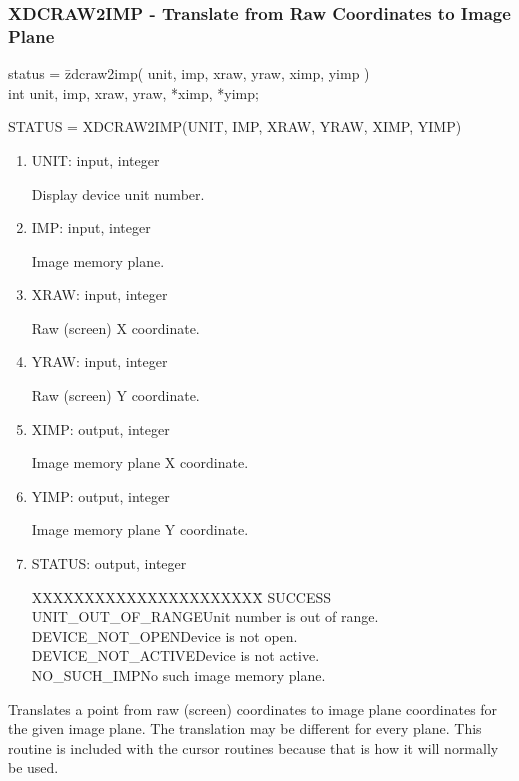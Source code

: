 \subsubsection{XDCRAW2IMP - Translate from Raw Coordinates to Image Plane}
\begin{tabbing}
status = \=zdcraw2imp( unit, imp, xraw, yraw, ximp, yimp )\\
\>int  unit, imp, xraw, yraw, *ximp, *yimp;\\
\end{tabbing}
STATUS = XDCRAW2IMP(UNIT, IMP, XRAW, YRAW, XIMP, YIMP)
\begin{enumerate}
\item UNIT:  input, integer

Display device unit number.
\item IMP:  input, integer

Image memory plane.
\item XRAW:  input, integer

Raw (screen) X coordinate.
\item YRAW:  input, integer

Raw (screen) Y coordinate.
\item XIMP:  output, integer

Image memory plane X coordinate.
\item YIMP:  output, integer

Image memory plane Y coordinate.
\item STATUS:  output, integer
\begin{tabbing}
XXXXXXXXXXXXXXXXXXXXXX\=\kill
SUCCESS\\
UNIT\_OUT\_OF\_RANGE\>Unit number is out of range.\\
DEVICE\_NOT\_OPEN\>Device is not open.\\
DEVICE\_NOT\_ACTIVE\>Device is not active.\\
NO\_SUCH\_IMP\>No such image memory plane.\\
\end{tabbing}
\end{enumerate}
Translates a point from raw (screen) coordinates to image plane
coordinates for the given image plane.  The translation may be
different for every plane.  This routine is included with the
cursor routines because that is how it will normally be used.
\newpage
